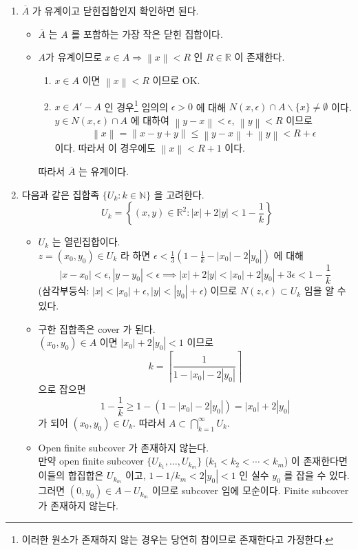 \documentclass[12pt]{report}
\newcommand{\numl}[1]{\item[\large\textbf{\sffamily #1.}]}
\newcommand{\norm}[1]{\left\lVert#1\right\rVert}
\newcommand{\Ra}{\Rightarrow}
\newcommand{\abs}[1]{\left|#1\right|}
\newcommand{\imp}{\implies}
\newcommand{\bs}{\backslash}
\newcommand{\R}{\mathbb{R}}
\newcommand{\N}{\mathbb{N}}
\begin{document}
\begin{enumerate}
\numl{4} $\overline{A}$ 가 유계이고 닫힌집합인지 확인하면 된다.
\begin{itemize}
	\item $\overline{A}$ 는 $A$ 를 포함하는 가장 작은 닫힌 집합이다.
	\item $A$가 유계이므로 $x\in A \Ra \norm{x}<R$ 인 $R\in\R$ 이 존재한다.
	\begin{enumerate}
		\item $x\in A$ 이면 $\norm{x}<R$ 이므로 OK.
		\item $x\in A' - A$ 인 경우\footnote{이러한 원소가 존재하지 않는 경우는 당연히 참이므로 존재한다고 가정한다.} 임의의 $\epsilon > 0$ 에 대해 $N(x, \epsilon) \cap A\bs \{x\} \neq \emptyset$ 이다. $y\in N(x, \epsilon) \cap A$ 에 대하여 $\norm{y-x} < \epsilon$, $\norm{y}<R$ 이므로
		$$\norm{x} = \norm{x-y+y} \leq \norm{y-x}+\norm{y} <R + \epsilon$$
		이다. 따라서 이 경우에도 $\norm{x} < R + 1$ 이다.
	\end{enumerate}
	따라서 $\overline{A}$ 는 유계이다.
\end{itemize}

\numl{5} 다음과 같은 집합족 $\{U_k: k\in\N\}$ 을 고려한다.
$$U_k = \left\{(x, y)\in \R^2: \abs{x}+2\abs{y} < 1-\frac{1}{k} \right\}$$
\begin{itemize}
	\item $U_k$ 는 열린집합이다.\\
	$z = (x_0, y_0) \in U_k$ 라 하면 $\epsilon < \frac{1}{3}(1-\frac{1}{k}-\abs{x_0}-2\abs{y_0})$ 에 대해
	$$\abs{x - x_0} <\epsilon, \abs{y-y_0}<\epsilon \imp \abs{x}+2\abs{y} < \abs{x_0} + 2\abs{y_0} + 3\epsilon < 1 - \frac{1}{k}$$
	(삼각부등식: $\abs{x} < \abs{x_0}+\epsilon, \abs{y} < \abs{y_0}+\epsilon$) 이므로 $N(z, \epsilon) \subset U_k$ 임을 알 수 있다.
	\item 구한 집합족은 cover 가 된다.\\
	$(x_0, y_0)\in A$ 이면 $\abs{x_0} + 2\abs{y_0} < 1$ 이므로  $$k = \left\lceil \frac{1}{1 -\abs{x_0} - 2\abs{y_0}}\right\rceil$$ 으로 잡으면 $$1-\frac{1}{k} \geq 1 - (1 -\abs{x_0} - 2\abs{y_0}) = \abs{x_0} + 2\abs{y_0}$$ 가 되어 $(x_0, y_0)\in U_k$. 따라서 $A \subset \bigcap_{k = 1}^\infty U_k$.
	\item Open finite subcover 가 존재하지 않는다.\\
	만약 open finite subcover $\{U_{k_1}, \dots, U_{k_m} \}$ ($k_1<k_2<\cdots<k_m$) 이 존재한다면 이들의 합집합은 $U_{k_m}$ 이고, $1 - 1/k_m < 2\abs{y_0} < 1$ 인 실수 $y_0$ 를 잡을 수 있다. 그러면 $(0, y_0) \in A - U_{k_m}$ 이므로 subcover 임에 모순이다. Finite subcover 가 존재하지 않는다.
\end{itemize}


\end{enumerate}
\end{document}

